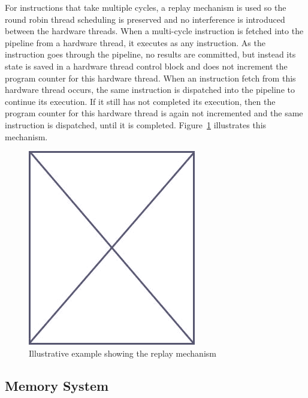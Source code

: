 For instructions that take multiple cycles, a replay mechanism is used so the round robin thread scheduling is preserved and no interference is introduced between the hardware threads.
When a multi-cycle instruction is fetched into the pipeline from a hardware thread, it executes as any instruction.
As the instruction goes through the pipeline, no results are committed, but instead its state is saved in a hardware thread control block and does not increment the program counter for this hardware thread. 
When an instruction fetch from this hardware thread occurs, the same instruction is dispatched into the pipeline to continue its execution. 
If it still has not completed its execution, then the program counter for this hardware thread is again not incremented and the same instruction is dispatched, until it is completed. 
Figure~\ref{fig:replay_mechanism_example} illustrates this mechanism.    

\begin{figure}
\begin{center}
\includegraphics[scale=.4]{figs/placeholder}
\end{center}
\caption{Illustrative example showing the replay mechanism}
\label{fig:replay_mechanism_example}
\end{figure}


\subsection{Memory System}
\label{subsection:memory_system}

